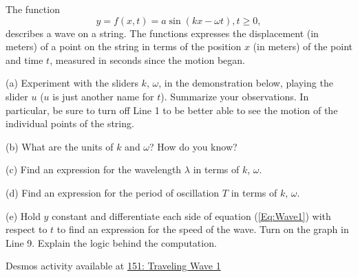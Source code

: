 \documentclass{ximera}
\begin{document}
\begin{question}   \label{Q:DFLDFDFGggg}
The function
\begin{equation}  \label{Eq:Wave1}
      y= f(x,t) = a \sin (kx - \omega t) , t\geq 0,
\end{equation}
describes a wave on a string. The functions expresses the displacement (in meters) of a point on the string in terms of the position $x$ (in meters) of the point and time $t$, measured in seconds since the motion began.

(a) Experiment with the sliders $k$, $\omega$, in the demonstration below, playing the slider $u$ ($u$ is just another name for $t$). Summarize your observations. In particular, be sure to turn off Line 1 to be better able to see the motion of the individual points of the string.

(b) What are the units of $k$ and $\omega$? How do you know?

(c) Find an expression for the wavelength $\lambda$ in terms of $k$, $\omega$.

(d) Find an expression for the period of oscillation $T$ in terms of $k$, $\omega$.
 
(e) Hold $y$ constant and differentiate each side of equation (\ref{Eq:Wave1}) with respect to $t$ to find an expression for the speed of the wave. Turn on the graph in Line 9. Explain the logic behind the computation. 

\begin{onlineOnly}
    \begin{center}
\end{center}
\end{onlineOnly}

Desmos activity available at \href{https://www.desmos.com/calculator/9xmkig9hwi}{151: Traveling Wave 1}

\end{question}
\end{document}
